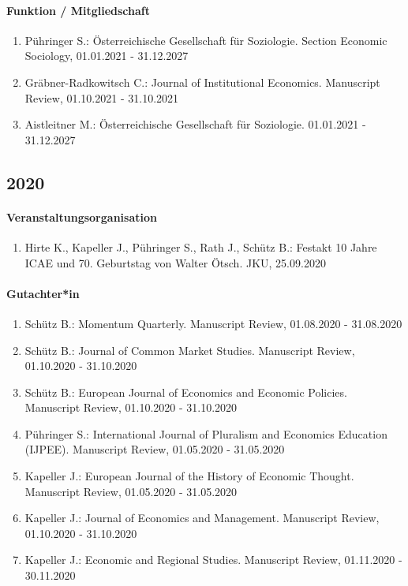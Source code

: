 \paragraph{Funktion / Mitgliedschaft}
\begin{enumerate}[leftmargin=*, labelsep=0.5cm]
\item Pühringer S.: Österreichische Gesellschaft für Soziologie. Section Economic Sociology, 01.01.2021 - 31.12.2027
\item Gräbner-Radkowitsch C.: Journal of Institutional Economics. Manuscript Review, 01.10.2021 - 31.10.2021
\item Aistleitner M.: Österreichische Gesellschaft für Soziologie. 01.01.2021 - 31.12.2027
\end{enumerate}
\subsection*{2020}
\paragraph{Veranstaltungsorganisation}
\begin{enumerate}[leftmargin=*, labelsep=0.5cm]
\item Hirte K., Kapeller J., Pühringer S., Rath J., Schütz B.: Festakt 10 Jahre ICAE und 70. Geburtstag von Walter Ötsch. JKU, 25.09.2020
\end{enumerate}

\paragraph{Gutachter*in}
\begin{enumerate}[leftmargin=*, labelsep=0.5cm]
\item Schütz B.: Momentum Quarterly. Manuscript Review, 01.08.2020 - 31.08.2020
\item Schütz B.: Journal of Common Market Studies. Manuscript Review, 01.10.2020 - 31.10.2020
\item Schütz B.: European Journal of Economics and Economic Policies. Manuscript Review, 01.10.2020 - 31.10.2020
\item Pühringer S.: International Journal of Pluralism and Economics Education (IJPEE). Manuscript Review, 01.05.2020 - 31.05.2020
\item Kapeller J.: European Journal of the History of Economic Thought. Manuscript Review, 01.05.2020 - 31.05.2020
\item Kapeller J.: Journal of Economics and Management. Manuscript Review, 01.10.2020 - 31.10.2020
\item Kapeller J.: Economic and Regional Studies. Manuscript Review, 01.11.2020 - 30.11.2020
\end{enumerate}


